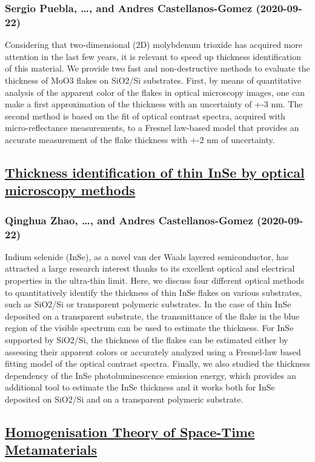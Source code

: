 {\subsubsection*{Sergio Puebla, \dots, and Andres Castellanos-Gomez (2020-09-22)}
Considering that two-dimensional (2D) molybdenum trioxide has acquired more
attention in the last few years, it is relevant to speed up thickness
identification of this material. We provide two fast and non-destructive
methods to evaluate the thickness of MoO3 flakes on SiO2/Si substrates. First,
by means of quantitative analysis of the apparent color of the flakes in
optical microscopy images, one can make a first approximation of the thickness
with an uncertainty of +-3 nm. The second method is based on the fit of optical
contrast spectra, acquired with micro-reflectance measurements, to a Fresnel
law-based model that provides an accurate measurement of the flake thickness
with +-2 nm of uncertainty.

\subsection*{\href{http://arxiv.org/abs/2009.10489v1}{Thickness identification of thin InSe by optical microscopy methods}}
\subsubsection*{Qinghua Zhao, \dots, and Andres Castellanos-Gomez (2020-09-22)}
Indium selenide (InSe), as a novel van der Waals layered semiconductor, has
attracted a large research interest thanks to its excellent optical and
electrical properties in the ultra-thin limit. Here, we discuss four different
optical methods to quantitatively identify the thickness of thin InSe flakes on
various substrates, such as SiO2/Si or transparent polymeric substrates. In the
case of thin InSe deposited on a transparent substrate, the transmittance of
the flake in the blue region of the visible spectrum can be used to estimate
the thickness. For InSe supported by SiO2/Si, the thickness of the flakes can
be estimated either by assessing their apparent colors or accurately analyzed
using a Fresnel-law based fitting model of the optical contrast spectra.
Finally, we also studied the thickness dependency of the InSe photoluminescence
emission energy, which provides an additional tool to estimate the InSe
thickness and it works both for InSe deposited on SiO2/Si and on a transparent
polymeric substrate.

\subsection*{\href{http://arxiv.org/abs/2009.10479v1}{Homogenisation Theory of Space-Time Metamaterials}}
}
